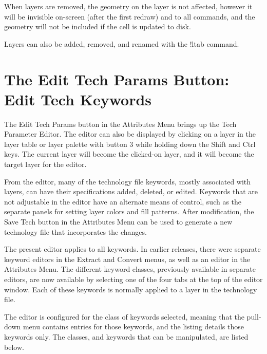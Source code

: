 When layers are removed, the geometry on the layer is not affected,
however it will be invisible on-screen (after the first redraw) and to
all commands, and the geometry will not be included if the cell is
updated to disk.
    
Layers can also be added, removed, and renamed with the {\cb !ltab}
command.


\section{The {\cb Edit Tech Params} Button: Edit Tech Keywords}

The {\cb Edit Tech Params} button in the {\cb Attributes Menu} brings
up the {\cb Tech Parameter Editor}.  The editor can also be displayed
by clicking on a layer in the layer table or layer palette with button
3 while holding down the {\kb Shift} and {\kb Ctrl} keys.  The current
layer will become the clicked-on layer, and it will become the target
layer for the editor.

From the editor, many of the technology file keywords, mostly
associated with layers, can have their specifications added, deleted,
or edited.  Keywords that are not adjustable in the editor have an
alternate means of control, such as the separate panels for setting
layer colors and fill patterns.  After modification, the {\cb Save
Tech} button in the {\cb Attributes Menu} can be used to generate a
new technology file that incorporates the changes.

The present editor applies to all keywords.  In earlier {\Xic}
releases, there were separate keyword editors in the {\cb Extract} and
{\cb Convert} menus, as well as an editor in the {\cb Attributes
Menu}.  The different keyword classes, previously available in
separate editors, are now available by selecting one of the four tabs
at the top of the editor window.  Each of these keywords is normally
applied to a layer in the technology file.

The editor is configured for the class of keywords selected, meaning
that the pull-down menu contains entries for those keywords, and the
listing details those keywords only.  The classes, and keywords that
can be manipulated, are listed below.

